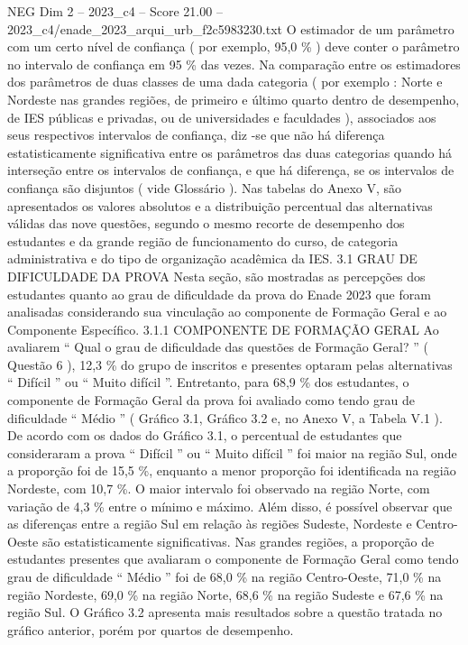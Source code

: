 \begin{textsample}{NEG Dim 2 – 2023\_c4 – Score 21.00 – 2023\_c4/enade\_2023\_arqui\_urb\_f2c5983230.txt}
O estimador de um parâmetro com um certo nível de confiança ( por exemplo, 95,0 \% ) deve conter o parâmetro no intervalo de confiança em 95 \% das vezes.
Na comparação entre os estimadores dos parâmetros de duas classes de uma dada categoria ( por exemplo : Norte e Nordeste nas grandes regiões, de primeiro e último quarto dentro de desempenho, de IES públicas e privadas, ou de universidades e faculdades ), associados aos seus respectivos intervalos de confiança, diz -se que não há diferença estatisticamente significativa entre os parâmetros das duas categorias quando há interseção entre os intervalos de confiança, e que há diferença, se os intervalos de confiança são disjuntos ( vide Glossário ).
Nas tabelas do Anexo V, são apresentados os valores absolutos e a distribuição percentual das alternativas válidas das nove questões, segundo o mesmo recorte de desempenho dos estudantes e da grande região de funcionamento do curso, de categoria administrativa e do tipo de organização acadêmica da IES. 3.1 GRAU DE DIFICULDADE DA PROVA Nesta seção, são mostradas as percepções dos estudantes quanto ao grau de dificuldade da prova do Enade 2023 que foram analisadas considerando sua vinculação ao componente de Formação Geral e ao Componente Específico. 3.1.1 COMPONENTE DE FORMAÇÃO GERAL Ao avaliarem “ Qual o grau de dificuldade das questões de Formação Geral? ” ( Questão 6 ), 12,3 \% do grupo de inscritos e presentes optaram pelas alternativas “ Difícil ” ou “ Muito difícil ”.
Entretanto, para 68,9 \% dos estudantes, o componente de Formação Geral da prova foi avaliado como tendo grau de dificuldade “ Médio ” ( Gráfico 3.1, Gráfico 3.2 e, no Anexo V, a Tabela V.1 ).
De acordo com os dados do Gráfico 3.1, o percentual de estudantes que consideraram a prova “ Difícil ” ou “ Muito difícil ” foi maior na região Sul, onde a proporção foi de 15,5 \%, enquanto a menor proporção foi identificada na região Nordeste, com 10,7 \%.
O maior intervalo foi observado na região Norte, com variação de 4,3 \% entre o mínimo e máximo.
Além disso, é possível observar que as diferenças entre a região Sul em relação às regiões Sudeste, Nordeste e Centro-Oeste são estatisticamente significativas.
Nas grandes regiões, a proporção de estudantes presentes que avaliaram o componente de Formação Geral como tendo grau de dificuldade “ Médio ” foi de 68,0 \% na região Centro-Oeste, 71,0 \% na região Nordeste, 69,0 \% na região Norte, 68,6 \% na região Sudeste e 67,6 \% na região Sul.
O Gráfico 3.2 apresenta mais resultados sobre a questão tratada no gráfico anterior, porém por quartos de desempenho.

\end{textsample}
